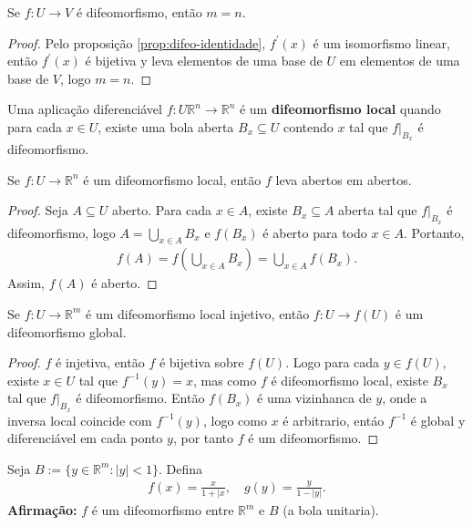 \begin{proposition}
  Se $f:U\to V$ é difeomorfismo, então $m=n$. 
\end{proposition}
\begin{proof} 
  Pelo proposição \ref{prop:difeo-identidade}, $f^{\prime}(x)$ é um isomorfismo linear, então $f^{\prime}(x)$ é bijetiva y leva elementos de uma base de $U$ em elementos de uma base de $V$, logo $m=n$.
\end{proof}
\begin{definition}
  Uma aplicação diferenciável $f:U\mathbb{R}^{n}\to\mathbb{R}^{n}$ é um \textbf{difeomorfismo local} quando para cada $x\in U$, existe uma bola aberta $B_x\subseteq U$ contendo $x$ tal que $f\big|_{B_x}$ é difeomorfismo. 
\end{definition}
\begin{proposition}
  Se $f:U\to\mathbb{R}^{n}$ é um difeomorfismo local, então $f$ leva abertos em abertos.
\end{proposition}
\begin{proof} 
  Seja $A\subseteq U$ aberto. Para cada $x\in A$, existe $B_x\subseteq A$ aberta tal que $f\big|_{B_x}$ é difeomorfismo, logo $A=\bigcup_{x\in A}B_x$ e $f(B_x)$ é aberto para todo $x\in A$. Portanto,
  \begin{align*}
    f(A)=f\left( \bigcup_{x\in A}B_x \right)=\bigcup_{x\in A}f(B_x).
  \end{align*}
  Assim, $f(A)$ é aberto. 
\end{proof}
\begin{proposition}
  Se $f:U\to\mathbb{R}^{m}$ é um difeomorfismo local injetivo, então $f:U\to f(U)$ é um difeomorfismo global. 
\end{proposition}
\begin{proof} 
  $f$ é injetiva, então $f$ é bijetiva sobre $f(U)$. Logo para cada $y\in f(U)$, existe $x\in U$ tal que $f^{-1}(y)=x$, mas como $f$ é difeomorfismo local, existe $B_x$ tal que $f\big|_{B_x}$ é difeomorfismo. Então $f(B_x)$ é uma vizinhanca de $y$, onde a inversa local coincide com $f^{-1}(y)$, logo como $x$ é arbitrario, entáo $f^{-1}$ é global y diferenciável em cada ponto $y$, por tanto $f$ é um difeomorfismo. 
\end{proof}
\begin{example}
  Seja $B:=\{y\in\mathbb{R}^{m}:|y|<1\}$. Defina
  \begin{align*}
    f(x)=\frac{x}{1+|x},\quad g(y)=\frac{y}{1-|y|}.
  \end{align*}
  \textbf{Afirmação:} $f$ é um difeomorfismo entre $\mathbb{R}^{m}$ e $B$ (a bola unitaria). 
\end{example}
